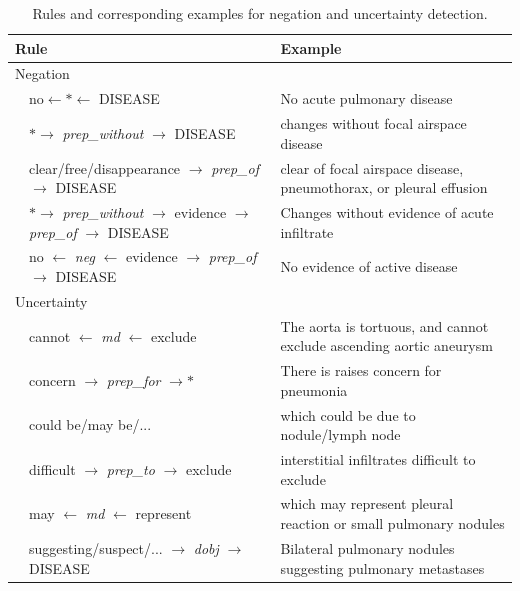 \documentclass[10pt,twocolumn,letterpaper]{article}
\begin{document}
\begin{table}[t]
	\begin{center}
		\begin{tabular}{ll|l}
			\hline
			\multicolumn{2}{l|}{Rule} & Example\\
			\hline\hline
			\multicolumn{3}{l}{Negation} \\
			\hline
			& no$\leftarrow * \leftarrow$ DISEASE & No acute pulmonary disease\\
			
			& $* \rightarrow$ \textit{prep\_without} $\rightarrow$ DISEASE & changes without focal airspace disease\\
			
			& clear/free/disappearance $\rightarrow$ \textit{prep\_of} $\rightarrow$ DISEASE & clear of focal airspace disease, pneumothorax, or pleural effusion\\
			
			& $* \rightarrow$ \textit{prep\_without} $\rightarrow$ evidence $\rightarrow$ \textit{prep\_of} $\rightarrow$ DISEASE & Changes without evidence of acute infiltrate \\
			
			& no $\leftarrow$ \textit{neg} $\leftarrow$ evidence $\rightarrow$ \textit{prep\_of} $\rightarrow$ DISEASE & No evidence of active disease \\
			\hline
			\multicolumn{3}{l}{Uncertainty}\\
			\hline
			& cannot $\leftarrow$ \textit{md} $\leftarrow$ exclude & The aorta is tortuous, and cannot exclude ascending aortic aneurysm\\
			& concern $\rightarrow$ \textit{prep\_for} $\rightarrow *$ & There is raises concern for pneumonia \\
			& could be/may be/... & which could be due to nodule/lymph node \\
			& difficult $\rightarrow$ \textit{prep\_to} $\rightarrow$ exclude & interstitial infiltrates difficult to exclude \\
			& may $\leftarrow$ \textit{md} $\leftarrow$ represent & which may represent pleural reaction or small pulmonary nodules \\
			& suggesting/suspect/... $\rightarrow$ \textit{dobj} $\rightarrow$ DISEASE & Bilateral pulmonary nodules suggesting pulmonary metastases \\
			\hline
		\end{tabular}
	\end{center}
	\caption{Rules and corresponding examples for negation and uncertainty detection.}
	\label{tab:rules}
\end{table}
\end{document}
